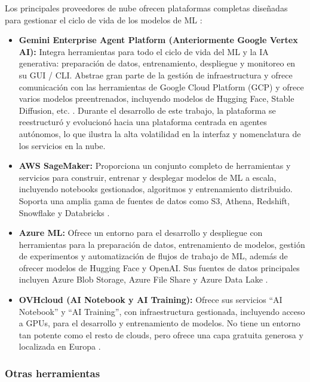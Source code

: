 Los principales proveedores de nube ofrecen plataformas completas diseñadas para gestionar el ciclo de vida de los modelos de ML \citep{comparisonAutoMLServices}:
\begin{itemize}
	\item \textbf{Gemini Enterprise Agent Platform (Anteriormente Google Vertex AI):} Integra herramientas para todo el ciclo de vida del ML y la IA generativa: preparación de datos, entrenamiento, despliegue y monitoreo en su GUI / CLI. Abstrae gran parte de la gestión de infraestructura y ofrece comunicación con las herramientas de Google Cloud Platform (GCP) y ofrece varios modelos preentrenados, incluyendo modelos de Hugging Face, Stable Diffusion, etc. \citep{GoogleVertexAI_CloudIA}. Durante el desarrollo de este trabajo, la plataforma se reestructuró y evolucionó hacia una plataforma centrada en agentes autónomos, lo que ilustra la alta volatilidad en la interfaz y nomenclatura de los servicios en la nube.
	
	\item \textbf{AWS SageMaker:} Proporciona un conjunto completo de herramientas y servicios para construir, entrenar y desplegar modelos de ML a escala, incluyendo notebooks gestionados, algoritmos y entrenamiento distribuido. Soporta una amplia gama de fuentes de datos como S3, Athena, Redshift, Snowflake y Databricks  \citep{AmazonSageMaker_CloudIA}.
	
	\item \textbf{Azure ML:} Ofrece un entorno para el desarrollo y despliegue con herramientas para la preparación de datos, entrenamiento de modelos, gestión de experimentos y automatización de flujos de trabajo de ML, además de ofrecer modelos de Hugging Face y OpenAI. Sus fuentes de datos principales incluyen Azure Blob Storage, Azure File Share y Azure Data Lake \citep{AzureMachineLearning_CloudIA}.
	
	\item \textbf{OVHcloud (AI Notebook y AI Training):} Ofrece sus servicios ``AI Notebook'' y ``AI Training'', con infraestructura gestionada, incluyendo acceso a GPUs, para el desarrollo y entrenamiento de modelos. No tiene un entorno tan potente como el resto de clouds, pero ofrece una capa gratuita generosa y localizada en Europa \citep{OVHcloud_CloudIA}.
	
\end{itemize}

\subsubsection{Otras herramientas}

